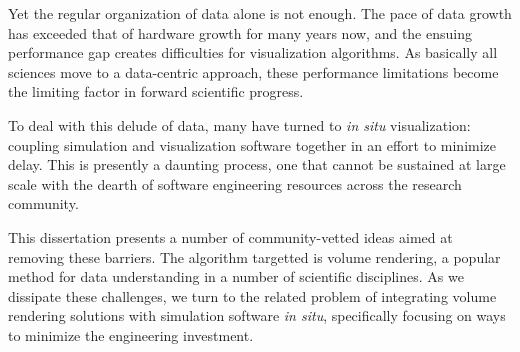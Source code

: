 Yet the regular organization of data alone is not enough.  The pace of
data growth has exceeded that of hardware growth for many years now,
and the ensuing performance gap creates difficulties for visualization
algorithms.  As basically all sciences move to a data-centric approach,
these performance limitations become the limiting factor in forward
scientific progress.

To deal with this delude of data, many have turned to \textit{in situ}
visualization: coupling simulation and visualization software together
in an effort to minimize delay.  This is presently a daunting process,
one that cannot be sustained at large scale with the dearth of software
engineering resources across the research community.

This dissertation presents a number of community-vetted ideas aimed at
removing these barriers.  The algorithm targetted is volume rendering,
a popular method for data understanding in a number of scientific
disciplines.  As we dissipate these challenges, we turn to the related
problem of integrating volume rendering solutions with
simulation software \textit{in situ}, specifically focusing on ways to
minimize the engineering investment.
